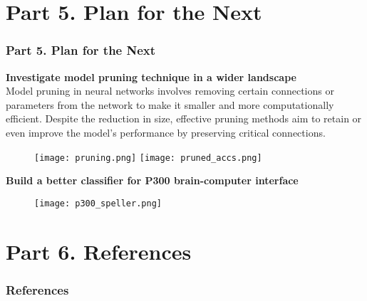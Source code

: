 \documentclass{beamer}
\begin{document}
	\section{Part 5. Plan for the Next}
	\begin{frame}[t]
		\frametitle{Part 5. Plan for the Next}
		\scriptsize
		\textbf{\small Investigate model pruning technique in a wider landscape}\\
		
		\vspace{1mm}
		Model pruning in neural networks involves removing certain connections or parameters from the network to make it smaller and more computationally efficient. Despite the reduction in size, effective pruning methods aim to retain or even improve the model's performance by preserving critical connections.
		\vspace{-3mm}
		\begin{figure}[H]
			\centering
			\subfloat
			{{\texttt{[image: pruning.png]} }}%
			\qquad
			\subfloat
			{{\texttt{[image: pruned\_accs.png]} }}%
			\label{fig:6}
		\end{figure}
	
		\textbf{\small Build a better classifier for P300 brain-computer interface}
		
		\vspace{-3mm}
		\begin{figure}[H]
			\centering
			\texttt{[image: p300\_speller.png]}
			\vspace*{-3mm}
			\label{fig:p300}
		\end{figure}
	\end{frame}
	
	\section{Part 6. References}
	\begin{frame}[t]
		\frametitle{References}
		\tiny
		
		
		
	\end{frame}
		
	
\end{document}
